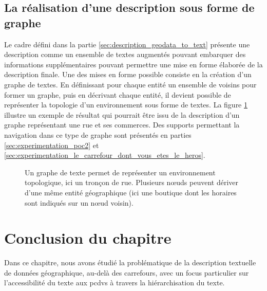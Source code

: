 \subsection{La réalisation d'une description sous forme de graphe}

\label{sec:description_graphe}

Le cadre défini dans la partie \ref{sec:description_geodata_to_text} présente une description comme un ensemble de textes augmentés pouvant embarquer des informations supplémentaires pouvant permettre une mise en forme élaborée de la description finale. Une des mises en forme possible consiste en la création d'un graphe de textes. En définissant pour chaque entité un ensemble de voisins pour former un graphe, puis en décrivant chaque entité, il devient possible de représenter la topologie d'un environnement sous forme de textes. La figure \ref{fig:desc_graphe_texte} illustre un exemple de résultat qui pourrait être issu de la description d'un graphe représentant une rue et ses commerces. Des supports permettant la navigation dans ce type de graphe sont présentés en parties \ref{sec:experimentation_poc2} et \ref{sec:experimentation_le_carrefour_dont_vous_etes_le_heros}.

\begin{figure}[ht]
    \centering
    \caption[Graphe de texte d'un tronçon de rue]{Un graphe de texte permet de représenter un environnement topologique, ici un tronçon de rue. Plusieurs nœuds peuvent dériver d'une même entité géographique (ici une boutique dont les horaires sont indiqués sur un nœud voisin).}
    \label{fig:desc_graphe_texte}
\end{figure}

\section{Conclusion du chapitre}

Dans ce chapitre, nous avons étudié la problématique de la description textuelle de données géographique, au-delà des carrefours, avec un focus particulier sur l'accessibilité du texte aux \glspl{pcdv} à travers la hiérarchisation du texte. 

